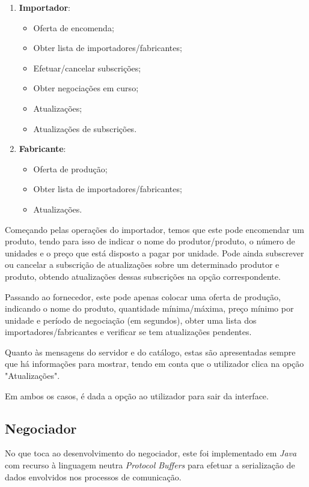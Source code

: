 \documentclass[a4paper]{report}
\begin{document}
	\begin{enumerate}
		\item \textbf{Importador}:
		\begin{itemize}
			\item Oferta de encomenda;
			\item Obter lista de importadores/fabricantes;
			\item Efetuar/cancelar subscrições;
			\item Obter negociações em curso;
			\item Atualizações;
			\item Atualizações de subscrições.
		\end{itemize}

		\item \textbf{Fabricante}:
		\begin{itemize}
			\item Oferta de produção;
			\item Obter lista de importadores/fabricantes;
			\item Atualizações.
		\end{itemize}
	\end{enumerate}

	Começando pelas operações do importador, temos que este pode encomendar um produto, tendo para isso de indicar o nome do produtor/produto, o número de unidades e o preço que está disposto a pagar por unidade. Pode ainda subscrever ou cancelar a subscrição de atualizações sobre um determinado produtor e produto, obtendo atualizações dessas subscrições na opção correspondente.
	
	Passando ao fornecedor, este pode apenas colocar uma oferta de produção, indicando o nome do produto, quantidade mínima/máxima, preço mínimo por unidade e período de negociação (em segundos), obter uma lista dos importadores/fabricantes e verificar se tem atualizações pendentes.
	
	Quanto às mensagens do servidor e do catálogo, estas são apresentadas sempre que há informações para mostrar, tendo em conta que o utilizador clica na opção "Atualizações".
	
	Em ambos os casos, é dada a opção ao utilizador para sair da interface.

	\subsection{Negociador}
	No que toca ao desenvolvimento do negociador, este foi implementado em \textit{Java} com recurso à linguagem neutra \textit{Protocol Buffers} para efetuar a serialização de dados envolvidos nos processos de comunicação. 
	
\end{document}
